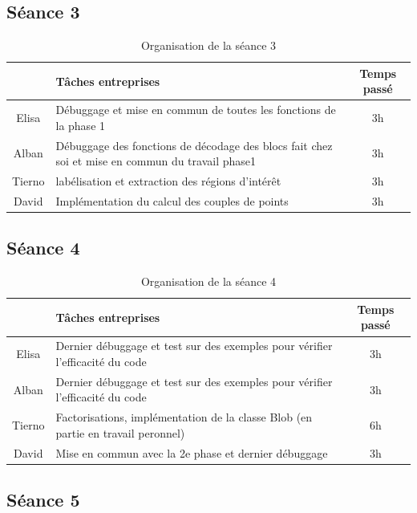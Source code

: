 \documentclass{rapport}
\begin{document}
\subsection{Séance 3}

\begin{table}[H]
	\centering 
	\begin{tabular}{c|p{12 cm}|c}
		& Tâches entreprises& Temps passé\\ \hline
		Elisa& Débuggage et mise en commun de toutes les fonctions de la phase 1 & 3h\\ \hline
		Alban& Débuggage des fonctions de décodage des blocs fait chez soi et mise en commun du travail phase1& 3h\\ \hline
		Tierno & labélisation et extraction des régions d'intérêt & 3h \\ \hline
		David & Implémentation du calcul des couples de points &  3h \\ \hline
	\end{tabular}
	\caption{Organisation de la séance 3}
\end{table}

\subsection{Séance 4}

\begin{table}[H]
	\centering 
	\begin{tabular}{c|p{12 cm}|c}
		& Tâches entreprises& Temps passé\\ \hline
		Elisa& Dernier débuggage et test sur des exemples pour vérifier l'efficacité du code& 3h\\ \hline
		Alban& Dernier débuggage et test sur des exemples pour vérifier l'efficacité du code& 3h\\ \hline
		Tierno & Factorisations, implémentation de la classe Blob (en partie en travail peronnel) & 6h\\ \hline
		David & Mise en commun avec la 2e phase et dernier débuggage &  3h \\ \hline
	\end{tabular}
	\caption{Organisation de la séance 4}
\end{table}

\subsection{Séance 5} %
\end{document}
